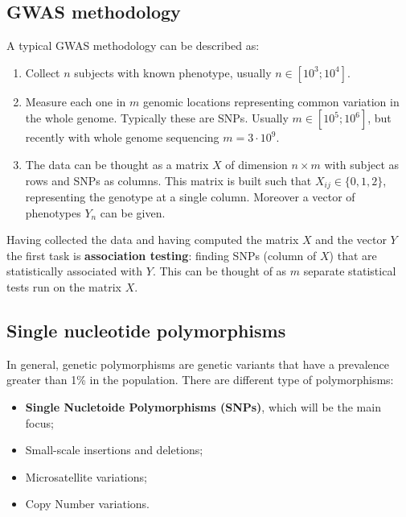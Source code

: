 	\subsection{GWAS methodology}
	A typical GWAS methodology can be described as:

	\begin{multicols}{2}
		\begin{enumerate}
			\item Collect $n$ subjects with known phenotype, usually $n\in [10^3;10^4]$.
			\item Measure each one in $m$ genomic locations representing common variation in the whole genome.
				Typically these are SNPs.
				Usually $m\in [10^5;10^6]$, but recently with whole genome sequencing $m = 3\cdot 10^9$.
			\item The data can be thought as a matrix $X$ of dimension $n \times m$ with subject as rows and SNPs as columns.
				This matrix is built such that $X_{ij} \in \{0,1,2\}$, representing the genotype at a single column.
				Moreover a vector of phenotypes $Y_n$ can be given.
		\end{enumerate}
	\end{multicols}

	Having collected the data and having computed the matrix $X$ and the vector $Y$ the first task is \textbf{association testing}: finding SNPs (column of $X$) that are statistically associated with $Y$.
	This can be thought of as $m$ separate statistical tests run on the matrix $X$.

	\subsection{Single nucleotide polymorphisms}
	In general, genetic polymorphisms are genetic variants that have a prevalence greater than 1\% in the population.
	There are different type of polymorphisms:

	\begin{multicols}{2}
		\begin{itemize}
		 \item \textbf{Single Nucletoide Polymorphisms (SNPs)}, which will be the main focus;
		 \item Small-scale insertions and deletions;
		 \item Microsatellite variations;
		 \item Copy Number variations.
		 \end{itemize}
	 \end{multicols}

